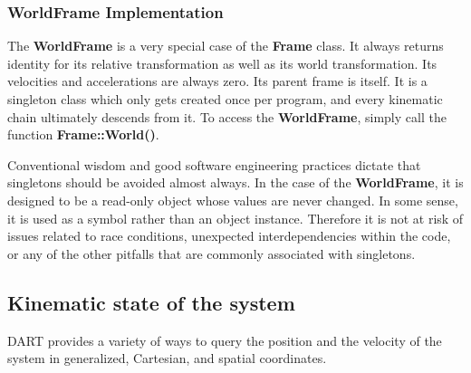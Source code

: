 \subsubsection{WorldFrame Implementation}

The \textbf{WorldFrame} is a very special case of the \textbf{Frame} class. It always returns identity for its relative transformation as well as its world transformation. Its velocities and accelerations are always zero. Its parent frame is itself. It is a singleton class which only gets created once per program, and every kinematic chain ultimately descends from it. To access the \textbf{WorldFrame}, simply call the function \textbf{Frame::World()}.

Conventional wisdom and good software engineering practices dictate that singletons should be avoided almost always. In the case of the \textbf{WorldFrame}, it is designed to be a read-only object whose values are never changed. In some sense, it is used as a symbol rather than an object instance. Therefore it is not at risk of issues related to race conditions, unexpected interdependencies within the code, or any of the other pitfalls that are commonly associated with singletons.

\subsection{Kinematic state of the system}
DART provides a variety of ways to query the position and the velocity of the system in generalized, Cartesian, and spatial coordinates. 

